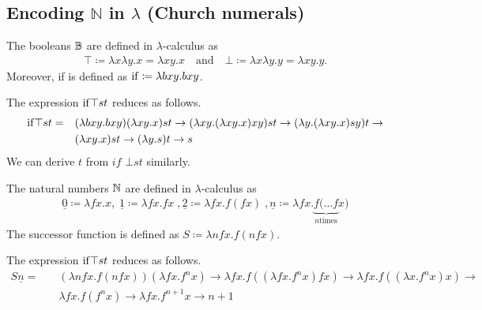 \subsection{Encoding $\mathbb{N}$ in $\lambda$ (Church numerals)}



\begin{definition}[$\BN$]
The booleans $\BN$ are defined in $\lambda$-calculus as
\begin{align*}
    \top \coloneqq \lambda x \lambda y.x = \lambda x y. x  \quad \text{and} \quad  \bot \coloneqq \lambda x \lambda y.y = \lambda x y. y.
\end{align*}
Moreover, if is defined as $\mathrm{if} \coloneqq \lambda b x y. bxy$.
    
\end{definition}


\begin{example}
The expression $\mathrm{if} \top  s  t$ reduces as follows.
\begin{align*}
\mathrm{if} \top  s  t  = \quad  &(\lambda bxy.bxy)(\lambda xy.x)st \to (\lambda xy.(\lambda xy.x)xy)st \to (\lambda y.(\lambda xy.x)sy)t \to \\
&(\lambda xy.x)st \to (\lambda y. s)t \to s 
\end{align*}
We can derive $t$ from $if$ $\bot st$ similarly.
\end{example} 



\begin{definition}[$\NN$]
The natural numbers $\NN$ are defined in $\lambda$-calculus as
\begin{align*}
    \underline{0} \coloneqq \lambda fx.x ,\;  
    \underline{1} \coloneqq \lambda fx.fx \; , 
    \underline{2} \coloneqq \lambda fx.f(fx) \;, 
    \underline{n} \coloneqq \lambda fx.\underbrace{f(\dots f }_{{n \text{times}}}x)
\end{align*}
The successor function is defined as $S \coloneqq \lambda nfx. f(nfx)$.
\end{definition}


\begin{example}
The expression $\mathrm{if} \top  s  t$ reduces as follows.
\begin{align*}
    S\underline{n} =\quad & (\lambda nfx. f(nfx))(\lambda fx .f^nx) \to \lambda fx. f((\lambda fx. f^nx)fx) \to \lambda fx.f((\lambda x. f^n x)x) \to \\
    &\lambda fx. f(f^n x) \to \lambda fx. f^{n+1}x \to n+1 
\end{align*}
\end{example}


